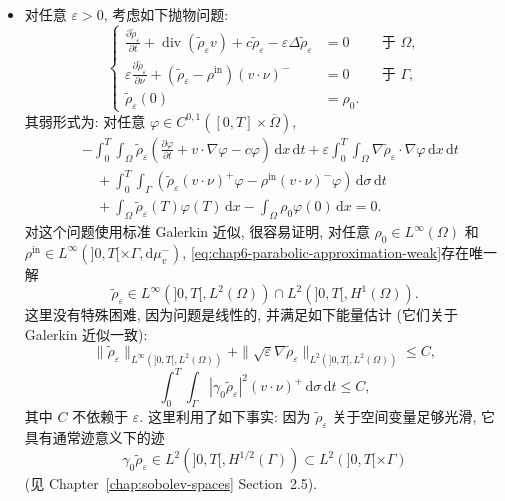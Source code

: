 \begin{sloppypar}
\begin{Proof}
\begin{itemize}
 \item 对任意 $\varepsilon>0$, 考虑如下抛物问题:
 \[
 \left\{
 \begin{aligned}
 \frac{\partial\widetilde\rho_\varepsilon}{\partial t}
 +\operatorname{div}(\widetilde\rho_\varepsilon v)
 +c\widetilde\rho_\varepsilon-\varepsilon\Delta\widetilde\rho_\varepsilon&=0&&\text{于 }\Omega,\\
 \varepsilon\frac{\partial\widetilde\rho_\varepsilon}{\partial\nu}
 +(\widetilde\rho_\varepsilon-\rho^{\mathrm{in}})(v\cdot\nu)^-&=0&&\text{于 }\Gamma,\\
 \widetilde\rho_\varepsilon(0)&=\rho_0.
 \end{aligned}
 \right.
 \]
 其弱形式为: 对任意 $\varphi\in C^{0,1}([0,T]\times\overline\Omega)$,
 \begin{equation}
 \begin{aligned}
 &-\int_0^T\int_\Omega\widetilde\rho_\varepsilon
 \left(\frac{\partial\varphi}{\partial t}+v\cdot\nabla\varphi-c\varphi\right)
 \,\mathrm dx\,\mathrm dt
 +\varepsilon\int_0^T\int_\Omega\nabla\widetilde\rho_\varepsilon\cdot\nabla\varphi
 \,\mathrm dx\,\mathrm dt\\
 &\quad+\int_0^T\int_\Gamma
 \left(\widetilde\rho_\varepsilon(v\cdot\nu)^+\varphi
 -\rho^{\mathrm{in}}(v\cdot\nu)^-\varphi\right)
 \,\mathrm d\sigma\,\mathrm dt\\
 &\quad+\int_\Omega\widetilde\rho_\varepsilon(T)\varphi(T)\,\mathrm dx
 -\int_\Omega\rho_0\varphi(0)\,\mathrm dx=0.
 \end{aligned}
 \label{eq:chap6-parabolic-approximation-weak}
 \end{equation}
 对这个问题使用标准 Galerkin 近似, 很容易证明, 对任意 $\rho_0\in L^\infty(\Omega)$ 和 $\rho^{\mathrm{in}}\in L^\infty(]0,T[\times\Gamma,\mathrm d\mu_v^-)$, \eqref{eq:chap6-parabolic-approximation-weak}存在唯一解
 \[
  \widetilde\rho_\varepsilon\in L^\infty(]0,T[,L^2(\Omega))
  \cap L^2(]0,T[,H^1(\Omega)).
 \]
 这里没有特殊困难, 因为问题是线性的, 并满足如下能量估计 (它们关于 Galerkin 近似一致):
 \begin{equation}
  \|\widetilde\rho_\varepsilon\|_{L^\infty(]0,T[,L^2(\Omega))}
  +\|\sqrt\varepsilon\nabla\widetilde\rho_\varepsilon\|_{L^2(]0,T[,L^2(\Omega))}
  \leq C,
 \label{eq:chap6-parabolic-energy-bounds}
 \end{equation}
 \begin{equation}
  \int_0^T\int_\Gamma|\gamma_0\widetilde\rho_\varepsilon|^2
  (v\cdot\nu)^+\,\mathrm d\sigma\,\mathrm dt\leq C,
 \label{eq:chap6-parabolic-outflow-bound}
 \end{equation}
 其中 $C$ 不依赖于 $\varepsilon$. 这里利用了如下事实: 因为 $\widetilde\rho_\varepsilon$ 关于空间变量足够光滑, 它具有通常迹意义下的迹
 \[
  \gamma_0\widetilde\rho_\varepsilon\in L^2(]0,T[,H^{1/2}(\Gamma))
  \subset L^2(]0,T[\times\Gamma)
 \]
 (见 Chapter~\ref{chap:sobolev-spaces} Section~2.5).


\end{itemize}
\end{Proof}
\end{sloppypar}
